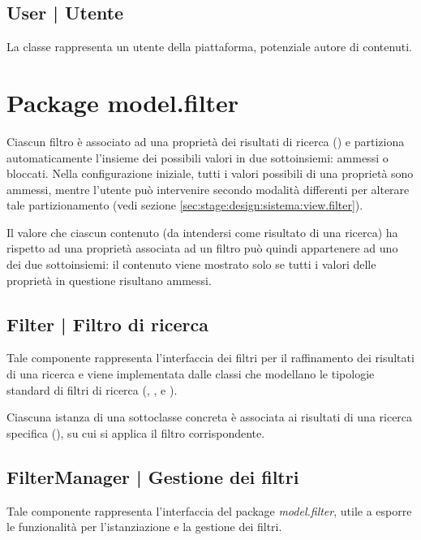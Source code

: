 \documentclass[10pt,a4paper,headinclude,footinclude,hidelinks]{scrreprt} %
\begin{document}
	\subsection[User]{User | Utente}
	\label{sec:stage:design:sistema:model.criteria:user}
	La classe rappresenta un utente della piattaforma, potenziale autore di contenuti.

	\section{Package model.filter}
	\label{sec:stage:design:sistema:model.filter}
	Ciascun filtro è associato ad una proprietà dei risultati di ricerca (\textit{}) e partiziona automaticamente l'insieme dei possibili valori in due sottoinsiemi: ammessi o bloccati. Nella configurazione iniziale, tutti i valori possibili di una proprietà sono ammessi, mentre l'utente può intervenire secondo modalità differenti per alterare tale partizionamento (vedi sezione \ref{sec:stage:design:sistema:view.filter}).
	
	Il valore che ciascun contenuto (da intendersi come risultato di una ricerca) ha rispetto ad una proprietà associata ad un filtro può quindi appartenere ad uno dei due sottoinsiemi: il contenuto viene mostrato solo se tutti i valori delle proprietà in questione risultano ammessi.

	\subsection[Filter]{Filter | Filtro di ricerca}
	\label{sec:stage:design:sistema:model.filter:filter}
	Tale componente rappresenta l'interfaccia dei filtri per il raffinamento dei risultati di una ricerca e viene implementata dalle classi che modellano le tipologie standard di filtri di ricerca (\textit{}, \textit{}, \textit{} e \textit{}).
	
	Ciascuna istanza di una sottoclasse concreta è associata ai risultati di una ricerca specifica (\textit{}), su cui si applica il filtro corrispondente.

	\subsection[FilterManager]{FilterManager | Gestione dei filtri}
	\label{sec:stage:design:sistema:model.filter:filter-manager}
	Tale componente rappresenta l'interfaccia del package \textit{model.filter}, utile a esporre le funzionalità per l'istanziazione e la gestione dei filtri.
\end{document}
